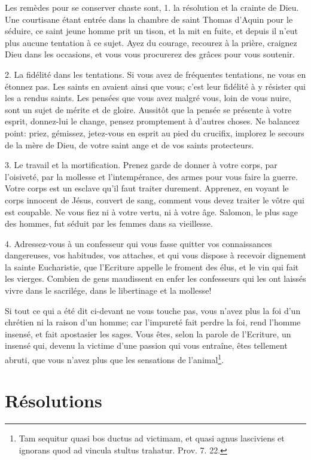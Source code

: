 \documentclass[instructions.tex]{subfiles}
\begin{document}
\secundo Les remèdes pour se conserver chaste sont, 1. la résolution et la crainte de Dieu. Une courtisane étant entrée dans la chambre de saint Thomas d’Aquin pour le séduire, ce saint jeune homme prit un tison, et la mit en fuite, et depuis il n’eut plus aucune tentation à ce sujet. Ayez du courage, recourez à la prière, craignez Dieu dans les occasions, et vous vous procurerez des grâces pour vous soutenir.
 
2. La fidélité dans les tentations. Si vous avez de fréquentes tentations, ne vous en étonnez pas. Les saints en avaient ainsi que vous; c’est leur fidélité à y résister qui les a rendus saints. Les pensées que vous avez malgré vous, loin de vous nuire, sont un sujet de mérite et de gloire. Aussitôt que la pensée se présente à votre esprit, donnez-lui le change, pensez promptement à d’autres choses. Ne balancez point: priez, gémissez, jetez-vous en esprit au pied du crucifix, implorez le secours de la mère de Dieu, de votre saint ange et de vos saints protecteurs.
 
3. Le travail et la mortification. Prenez garde de donner à votre corps, par l’oisiveté, par la mollesse et l’intempérance, des armes pour vous faire la guerre. Votre corps est un esclave qu’il faut traiter durement. Apprenez, en voyant le corps innocent de Jésus, couvert de sang, comment vous devez traiter le vôtre qui est coupable. Ne vous fiez ni à votre vertu, ni à votre âge. Salomon, le plus sage des hommes, fut séduit par les femmes dans sa vieillesse.
 
4. Adressez-vous à un confesseur qui vous fasse quitter vos connaissances dangereuses, vos habitudes, vos attaches, et qui vous dispose à recevoir dignement la sainte Eucharistie, que l’Ecriture appelle le froment des élus, et le vin qui fait les vierges. Combien de gens maudissent en enfer les confesseurs qui les ont laissés vivre dans le sacrilége, dans le libertinage et la mollesse!
 
Si tout ce qui a été dit ci-devant ne vous touche pas, vous n’avez plus la foi d’un chrétien ni la raison d’un homme; car l’impureté fait perdre la foi, rend l’homme insensé, et fait apostasier les sages. Vous êtes, selon la parole de l’Ecriture, un insensé qui, devenu la victime d’une passion qui vous entraîne, êtes tellement abruti, que vous n’avez plus que les sensations de l’animal\footnote{Tam sequitur quasi bos ductus ad victimam, et quasi agnus lasciviens et ignorans quod ad vincula stultus trahatur. Prov. 7. 22.}.
 
\section{Résolutions}
 
\end{document}
